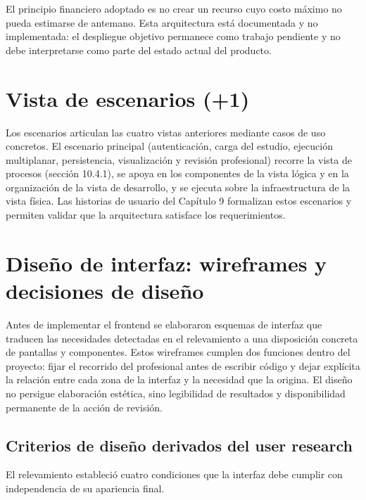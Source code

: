 El principio financiero adoptado es no crear un recurso cuyo costo máximo no pueda estimarse de antemano. Esta arquitectura está documentada y no implementada: el despliegue objetivo permanece como trabajo pendiente y no debe interpretarse como parte del estado actual del producto.

\section{Vista de escenarios (+1)}

Los escenarios articulan las cuatro vistas anteriores mediante casos de uso concretos. El escenario principal (autenticación, carga del estudio, ejecución multiplanar, persistencia, visualización y revisión profesional) recorre la vista de procesos (sección 10.4.1), se apoya en los componentes de la vista lógica y en la organización de la vista de desarrollo, y se ejecuta sobre la infraestructura de la vista física. Las historias de usuario del Capítulo 9 formalizan estos escenarios y permiten validar que la arquitectura satisface los requerimientos.

\section{Diseño de interfaz: wireframes y decisiones de diseño}

Antes de implementar el frontend se elaboraron esquemas de interfaz que traducen las necesidades detectadas en el relevamiento a una disposición concreta de pantallas y componentes. Estos wireframes cumplen dos funciones dentro del proyecto: fijar el recorrido del profesional antes de escribir código y dejar explícita la relación entre cada zona de la interfaz y la necesidad que la origina. El diseño no persigue elaboración estética, sino legibilidad de resultados y disponibilidad permanente de la acción de revisión.

\subsection{Criterios de diseño derivados del user research}

El relevamiento estableció cuatro condiciones que la interfaz debe cumplir con independencia de su apariencia final.

